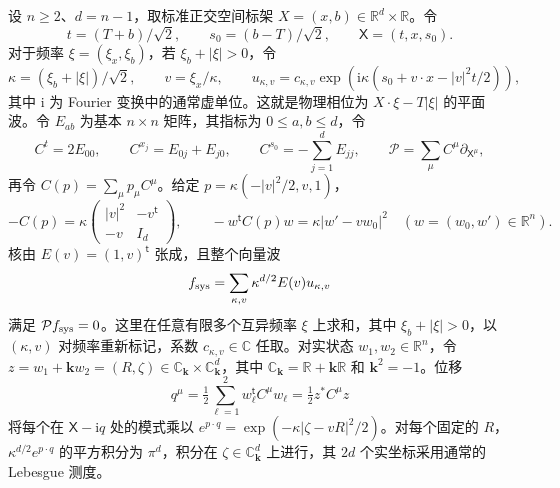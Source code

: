 设 $n\ge2$、$d=n-1$，取标准正交空间标架 $X=(x,b)\in\mathbb R^d\times\mathbb R$。令
\[
t=(T+b)/\sqrt2,\qquad s_0=(b-T)/\sqrt2,\qquad \mathsf X=(t,x,s_0).
\]
对于频率 $\xi=(\xi_x,\xi_b)$，若 $\xi_b+|\xi|>0$，令
\[
\kappa=(\xi_b+|\xi|)/\sqrt2,\qquad v=\xi_x/\kappa,\qquad
u_{\kappa,v}=c_{\kappa,v}\exp\!\left(\mathrm i\kappa(s_0+v\cdot x-|v|^2t/2)\right),
\]
其中 $\mathrm i$ 为 Fourier 变换中的通常虚单位。这就是物理相位为 $X\cdot\xi-T|\xi|$ 的平面波。令 $E_{ab}$ 为基本 $n\times n$ 矩阵，其指标为 $0\le a,b\le d$，令
\[
C^t=2E_{00},\qquad C^{x_j}=E_{0j}+E_{j0},\qquad C^{s_0}=-\sum_{j=1}^d E_{jj},
\qquad \mathcal P=\sum_\mu C^\mu\partial_{\mathsf X^\mu},
\]
再令 $C(p)=\sum_\mu p_\mu C^\mu$。给定 $p=\kappa(-|v|^2/2,v,1)$，
\[
-C(p)=\kappa
\begin{pmatrix}|v|^2&-v^{\mathsf t}\\-v&I_d\end{pmatrix},
\qquad -w^{\mathsf t}C(p)w=\kappa|w'-vw_0|^2\quad(w=(w_0,w')\in\mathbb R^n).
\]
核由 $E(v)=(1,v)^{\mathsf t}$ 张成，且整个向量波
\[
f_{\rm sys}=\sum_{\kappa,v}\kappa^{d/2}E(v)u_{\kappa,v}
\]
满足 $\mathcal P f_{\rm sys}=0$。这里在任意有限多个互异频率 $\xi$ 上求和，其中 $\xi_b+|\xi|>0$，以 $(\kappa,v)$ 对频率重新标记，系数 $c_{\kappa,v}\in\mathbb C$ 任取。对实状态 $w_1,w_2\in\mathbb R^n$，令 $z=w_1+\mathbf k w_2=(R,\zeta)\in\mathbb C_{\mathbf k}\times\mathbb C_{\mathbf k}^d$，其中 $\mathbb C_{\mathbf k}=\mathbb R+\mathbf k\mathbb R$ 和 $\mathbf k^2=-1$。位移
\[
q^\mu=\tfrac12\sum_{\ell=1}^2w_\ell^{\mathsf t}C^\mu w_\ell=\tfrac12z^*C^\mu z
\]
将每个在 $\mathsf X-\mathrm i q$ 处的模式乘以 $e^{p\cdot q}=\exp(-\kappa|\zeta-vR|^2/2)$。对每个固定的 $R$，$\kappa^{d/2}e^{p\cdot q}$ 的平方积分为 $\pi^d$，积分在 $\zeta\in\mathbb C_{\mathbf k}^d$ 上进行，其 $2d$ 个实坐标采用通常的 Lebesgue 测度。
